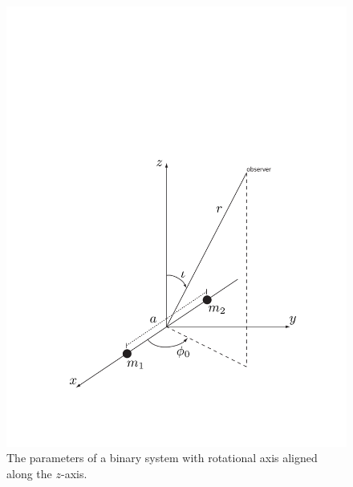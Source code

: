 \begin{figure}[p]
\begin{center}
\includegraphics[width=\linewidth]{figures/inspiral/binary}
\end{center}
\caption[Coordinates Used to Describe Gravitational Radiation from a Binary]{%
\label{f:binary}
The parameters of a binary system with rotational axis aligned along the
$z$-axis.
}
\end{figure}

